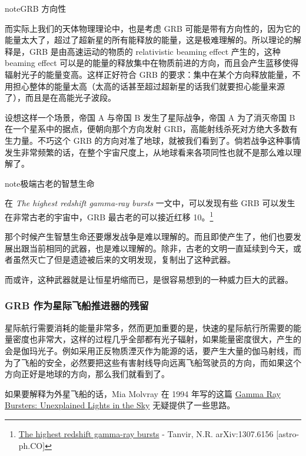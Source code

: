\documentclass[letterpaper,10pt,english]{sphinxmanual}
\begin{document}
\begin{notice}{note}{GRB 方向性}

而实际上我们的天体物理理论中，也是考虑 GRB 可能是带有方向性的，因为它的能量太大了，超过了超新星的所有能释放的能量，这是极难理解的。所以理论的解释是，GRB 是由高速运动的物质的 relativistic beaming effect 产生的，这种 beaming effect 可以是的能量的释放集中在物质前进的方向，而且会产生蓝移使得辐射光子的能量变高。这样正好符合 GRB 的要求：集中在某个方向释放能量，不用担心整体的能量太高（太高的话甚至超过超新星的话我们就要担心能量来源了），而且是在高能光子波段。
\end{notice}

设想这样一个场景，帝国 A 与帝国 B 发生了星际战争，帝国 A 为了消灭帝国 B 在一个星系中的据点，便朝向那个方向发射 GRB，高能射线杀死对方绝大多数有生力量。不巧这个 GRB 的方向对准了地球，就被我们看到了。倘若战争这种事情发生非常频繁的话，在整个宇宙尺度上，从地球看来各项同性也就不是那么难以理解了。

\begin{notice}{note}{极端古老的智慧生命}

在 \emph{The highest redshift gamma-ray bursts} 一文中，可以发现有些 GRB 可以发生在非常古老的宇宙中，GRB 最古老的可以接近红移 10。\footnote{
\href{http://arxiv.org/abs/1307.6156}{The highest redshift gamma-ray bursts} - Tanvir, N.R. arXiv:1307.6156 {[}astro-ph.CO{]}
}

那个时候产生智慧生命还要爆发战争是难以理解的。而且即使产生了，他们也要发展出跟当前相同的武器，也是难以理解的。除非，古老的文明一直延续到今天，或者虽然灭亡了但是遗迹被后来的文明发现，复制出了这种武器。

而或许，这种武器就是让恒星坍缩而已，是很容易想到的一种威力巨大的武器。
\end{notice}


\subsubsection{GRB 作为星际飞船推进器的残留}
\label{physics:id13}
星际航行需要消耗的能量非常多，然而更加重要的是，快速的星际航行所需要的能量密度也非常大，这样的过程几乎全部都有光子辐射，如果能量密度很大，产生的会是伽玛光子。例如采用正反物质湮灭作为能源的话，要产生大量的伽马射线，而为了飞船的安全，必然要把这些有害射线导向远离飞船驾驶员的方向，而如果这个方向正好是地球的方向，那么我们就看到了。

如果要解释为外星飞船的话，Mia Molvray 在 1994 年写的这篇 \href{http://www.molvray.com/sf/grb/grblog2.htm}{Gamma Ray Bursters: Unexplained Lights in the Sky} 无疑提供了一些思路。
\end{document}
